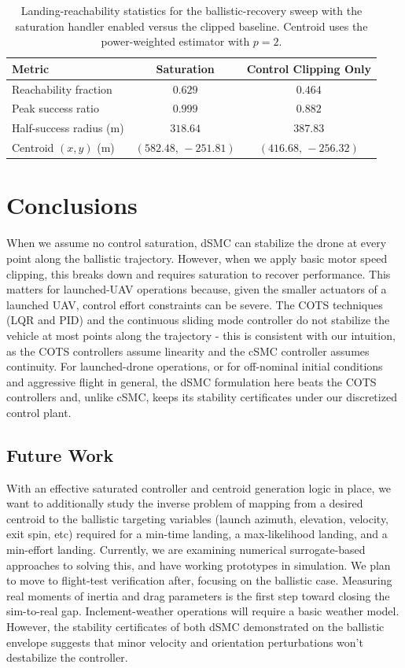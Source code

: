 \documentclass[conf]{new-aiaa}
\begin{document}
\small
\begin{table}[t]
\centering
\caption{Landing-reachability statistics for the ballistic-recovery sweep with the saturation handler enabled versus the clipped baseline. Centroid uses the power-weighted estimator with $p = 2$.}
\label{tab:sat_cmp_summary}
\footnotesize
\setlength{\tabcolsep}{4pt}
\renewcommand{\arraystretch}{0.85}
\begin{tabular}{lcc}
\toprule
\textbf{Metric} & \textbf{Saturation} & \textbf{Control Clipping Only} \\
\midrule
Reachability fraction & $0.629$ & $0.464$ \\
Peak success ratio & $0.999$ & $0.882$ \\
Half-success radius (m) & $318.64$ & $387.83$ \\
Centroid $(x, y)$ (m) & $(582.48,\, -251.81)$ & $(416.68,\, -256.32)$ \\
\bottomrule
\end{tabular}
\end{table}
\normalsize

\section{Conclusions}
When we assume no control saturation, dSMC can stabilize the drone at every point along the ballistic trajectory. However, when we apply basic motor speed clipping, this breaks down and requires saturation to recover performance. This matters for launched-UAV operations because, given the smaller actuators of a launched UAV, control effort constraints can be severe. The COTS techniques (LQR and PID) and the continuous sliding mode controller do not stabilize the vehicle at most points along the trajectory - this is consistent with our intuition, as the COTS controllers assume linearity and the cSMC controller assumes continuity. For launched-drone operations, or for off-nominal initial conditions and aggressive flight in general, the dSMC formulation here beats the COTS controllers and, unlike cSMC, keeps its stability certificates under our discretized control plant.

\subsection{Future Work}
With an effective saturated controller and centroid generation logic in place, we want to additionally study the inverse problem of mapping from a desired centroid to the ballistic targeting variables (launch azimuth, elevation, velocity, exit spin, etc) required for a min-time landing, a max-likelihood landing, and a min-effort landing. Currently, we are examining numerical surrogate-based approaches to solving this, and have working prototypes in simulation. We plan to move to flight-test verification after, focusing on the ballistic case. Measuring real moments of inertia and drag parameters is the first step toward closing the sim-to-real gap. Inclement-weather operations will require a basic weather model. However, the stability certificates of both dSMC demonstrated on the ballistic envelope suggests that minor velocity and orientation perturbations won’t destabilize the controller.
\end{document}
